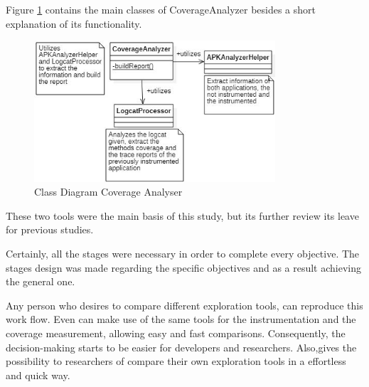 
Figure \ref{fig:ca} contains the main classes of CoverageAnalyzer besides a short explanation of its functionality.

\begin{figure}[h]
\centering
\includegraphics[width=0.8\textwidth]{../Figures/ClassDiagramCA.jpg}
\caption{Class Diagram Coverage Analyser}\label{fig:ca}
\end{figure}

These two tools were the main basis of this study, but its further review its leave for previous studies.

Certainly, all the stages were necessary in order to complete every objective. The stages design was made regarding the specific objectives and as a result achieving the general one.

Any person who desires to compare different exploration tools, can reproduce this work flow. Even can make use of the same tools for the instrumentation and the coverage measurement, allowing easy and fast comparisons. Consequently, the decision-making starts to be easier for developers and researchers. Also,gives the possibility to researchers of compare their own exploration tools in a effortless and quick way.